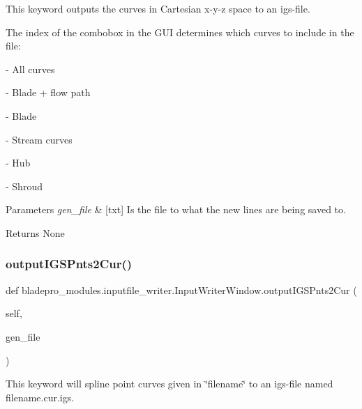 This keyword outputs the curves in Cartesian x-\/y-\/z space to an igs-\/file. 

The index of the combobox in the G\+UI determines which curves to include in the file\+:

\begin{DoxyItemize}
\item {} -\/ All curves \item {} -\/ Blade + flow path \item {} -\/ Blade \item {} -\/ Stream curves \item {} -\/ Hub \item {} -\/ Shroud\end{DoxyItemize}

\begin{DoxyParams}{Parameters}
{\em gen\+\_\+file} & \mbox{[}txt\mbox{]} Is the file to what the new lines are being saved to. \\
\hline
\end{DoxyParams}
\begin{DoxyReturn}{Returns}
None 
\end{DoxyReturn}
\hypertarget{a00070_a60dc6e0ccec5f096ee68f997079abef3}{}\label{a00070_a60dc6e0ccec5f096ee68f997079abef3} 
\subsubsection{\texorpdfstring{output\+I\+G\+S\+Pnts2\+Cur()}{outputIGSPnts2Cur()}}
{\footnotesize\ttfamily def bladepro\+\_\+modules.\+inputfile\+\_\+writer.\+Input\+Writer\+Window.\+output\+I\+G\+S\+Pnts2\+Cur (\begin{DoxyParamCaption}\item[{}]{self,  }\item[{}]{gen\+\_\+file }\end{DoxyParamCaption})}



This keyword will spline point curves given in \char`\"{}filename\char`\"{} to an igs-\/file named filename.\+cur.\+igs. 

